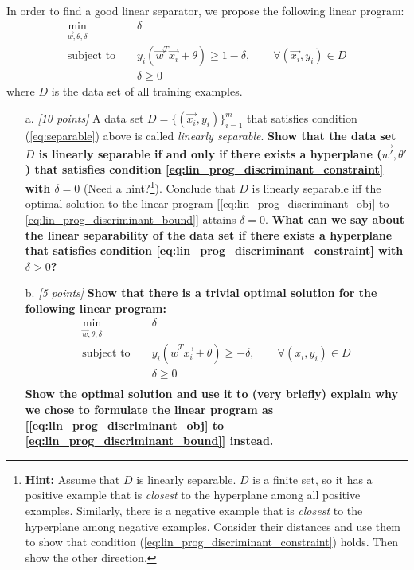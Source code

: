 In order to find a good linear separator, we propose the following linear program:
\begin{eqnarray}
  \min_{\vec{w}, \theta, \delta} & & \delta  \label{eq:lin_prog_discriminant_obj}\\
 \textrm{subject to } & & y_i(\vec{w}^T \vec{x_i} + \theta) \geq 1 - \delta, \qquad \forall (\vec{x_i},y_i) \in D  \label{eq:lin_prog_discriminant_constraint}\\
  & & \delta \geq 0  \label{eq:lin_prog_discriminant_bound}
\end{eqnarray}
where $D$ is the data set of all training examples.
\begin{enumerate}

  
  \item [a.] {\em[10 points]} A data set
      $D=\{(\vec{x_i},y_i)\}_{i=1}^m$ that satisfies 
      condition (\ref{eq:separable}) above is called
      {\em linearly separable}. 
      {\bf Show that the data set
      $D$ is linearly separable 
      if and only if there exists
      a hyperplane ($\vec{w'}, \theta'$) that satisfies 
      condition
      \eqref{eq:lin_prog_discriminant_constraint} with $\delta = 0$} 
	  (Need a hint?\footnote{{\bf Hint:} Assume that $D$ is linearly separable. $D$ is a
      finite set, so it has a positive example that is {\em closest}
      to the hyperplane among all positive examples. Similarly, there
      is a negative example that is {\em closest} to the hyperplane
      among negative examples. Consider their distances and use them
      to show that condition
      (\ref{eq:lin_prog_discriminant_constraint}) holds. Then show the
      other direction.
	  }).
      Conclude that $D$ is linearly separable iff the optimal solution
      to the linear program
      [\eqref{eq:lin_prog_discriminant_obj} to \eqref{eq:lin_prog_discriminant_bound}]
      attains $\delta = 0$.
      {\bf What can we say about the linear separability of the data set
      if there exists a hyperplane that satisfies condition
      \eqref{eq:lin_prog_discriminant_constraint} with $\delta > 0$?}

  \item [b.] {\em [5 points]} {\bf Show that there is a
      trivial optimal solution for the following linear
      program:}
    \begin{eqnarray*}
      \min_{\vec{w},\theta,\delta} & & \delta  \\
      \textrm{subject to } & & y_i(\vec{w}^T \vec{x_i} + \theta) \geq - \delta, \qquad \forall (x_i,y_i) \in D \\
      && \delta \geq 0  \\
    \end{eqnarray*}
	{\bf Show the optimal solution and use it to (very briefly)
	explain why we chose to formulate the linear program as
	[\eqref{eq:lin_prog_discriminant_obj} to \eqref{eq:lin_prog_discriminant_bound}]
	instead.}


\end{enumerate}
